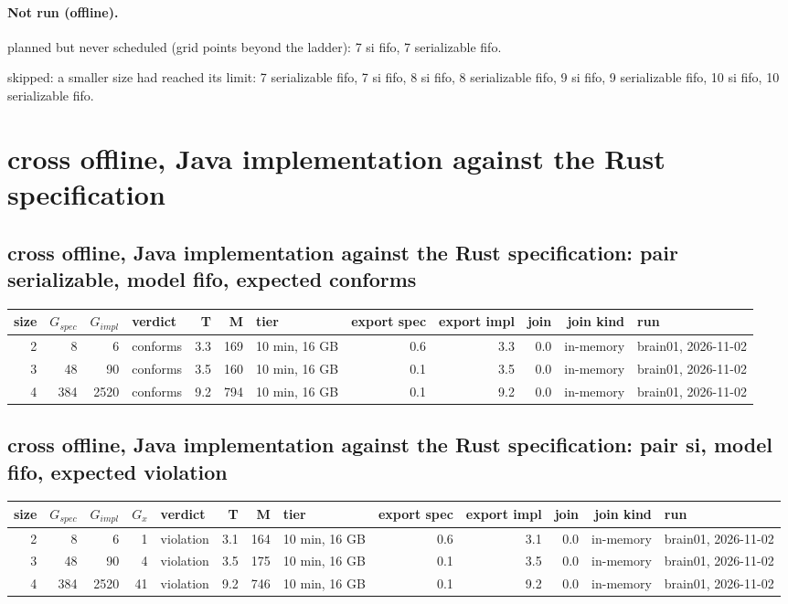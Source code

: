 \documentclass[10pt]{article}
\begin{document}
\paragraph{Not run (offline).}
planned but never scheduled (grid points beyond the ladder): 7 si fifo, 7 serializable fifo.\par
skipped: a smaller size had reached its limit: 7 serializable fifo, 7 si fifo, 8 si fifo, 8 serializable fifo, 9 si fifo, 9 serializable fifo, 10 si fifo, 10 serializable fifo.\par
\section*{cross offline, Java implementation against the Rust specification}
\subsection*{cross offline, Java implementation against the Rust specification: pair \textsf{serializable}, model fifo, expected conforms}
\begin{longtable}{@{}rrrlrrlrrrrl@{}}
\toprule
size & $G_{\mathit{spec}}$ & $G_{\mathit{impl}}$ & verdict & T & M & tier & export spec & export impl & join & join kind & run \\
\midrule
\endhead
\color{red} 2 & 8 & 6 & conforms & 3.3 & 169 & 10 min, 16 GB & 0.6 & 3.3 & 0.0 & in-memory & brain01, 2026-11-02 \\
\color{red} 3 & 48 & 90 & conforms & 3.5 & 160 & 10 min, 16 GB & 0.1 & 3.5 & 0.0 & in-memory & brain01, 2026-11-02 \\
\color{red} 4 & 384 & 2520 & conforms & 9.2 & 794 & 10 min, 16 GB & 0.1 & 9.2 & 0.0 & in-memory & brain01, 2026-11-02 \\
\bottomrule
\end{longtable}
\subsection*{cross offline, Java implementation against the Rust specification: pair \textsf{si}, model fifo, expected violation}
\begin{longtable}{@{}rrrrlrrlrrrrl@{}}
\toprule
size & $G_{\mathit{spec}}$ & $G_{\mathit{impl}}$ & $G_x$ & verdict & T & M & tier & export spec & export impl & join & join kind & run \\
\midrule
\endhead
\color{red} 2 & 8 & 6 & 1 & violation & 3.1 & 164 & 10 min, 16 GB & 0.6 & 3.1 & 0.0 & in-memory & brain01, 2026-11-02 \\
\color{red} 3 & 48 & 90 & 4 & violation & 3.5 & 175 & 10 min, 16 GB & 0.1 & 3.5 & 0.0 & in-memory & brain01, 2026-11-02 \\
\color{red} 4 & 384 & 2520 & 41 & violation & 9.2 & 746 & 10 min, 16 GB & 0.1 & 9.2 & 0.0 & in-memory & brain01, 2026-11-02 \\
\bottomrule
\end{longtable}
\end{document}
